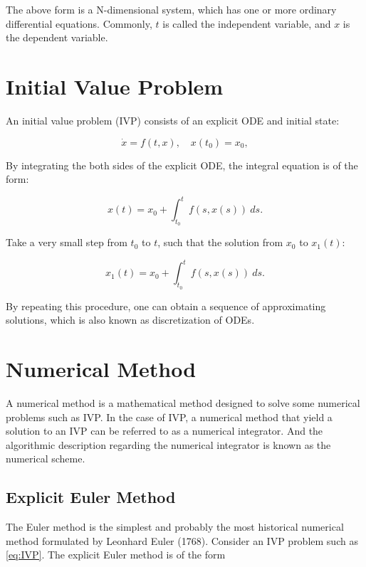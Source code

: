 \documentclass[
	parskip, 			   %
	twoside, 			   %
	DIV=14, 			   %
	BCOR=15.0mm, 		   %
	headsepline, 		   %
	open=right, 		   %
	captions=tableheading, %
	bibliography=totoc,    %
	numbers=noenddot       %
]{scrreprt}
\begin{document}
The above form is a N-dimensional system, which has one or more ordinary differential equations. Commonly, $t$ is called the independent variable, and $x$ is the dependent variable.

\section{Initial Value Problem}
An initial value problem (IVP) consists of an explicit ODE and initial state:

\begin{equation}
    \label{eq:IVP}
    \dot{x} = f(t, x), \quad x(t_{0})=x_{0},
\end{equation}

By integrating the both sides of the explicit ODE, the integral equation is of the form:

\begin{equation}
    \label{eq:solution_IVP}
    x(t) = x_{0} + \int_{t_{0}}^{t} f(s, x(s))\:ds.
\end{equation}

Take a very small step from $t_{0}$ to $t$, such that the solution from $x_{0}$ to $x_{1}(t)$:

\begin{equation}
    \label{eq:solution_IVP_first_step}
    x_{1}(t) = x_{0} + \int_{t_{0}}^{t} f(s, x(s))\:ds.
\end{equation}

By repeating this procedure, one can obtain a sequence of approximating solutions, which is also known as discretization of ODEs.

\clearpage
\section{Numerical Method}
A numerical method is a mathematical method designed to solve some numerical problems such as IVP. In the case of IVP, a numerical method that yield a solution to an IVP can be referred to as a numerical integrator. And the algorithmic description regarding the numerical integrator is known as the numerical scheme.
\subsection{Explicit Euler Method}
The Euler method is the simplest and probably the most historical numerical method formulated by Leonhard Euler (1768). Consider an IVP problem such as \ref{eq:IVP}. The explicit Euler method is of the form
\end{document}
